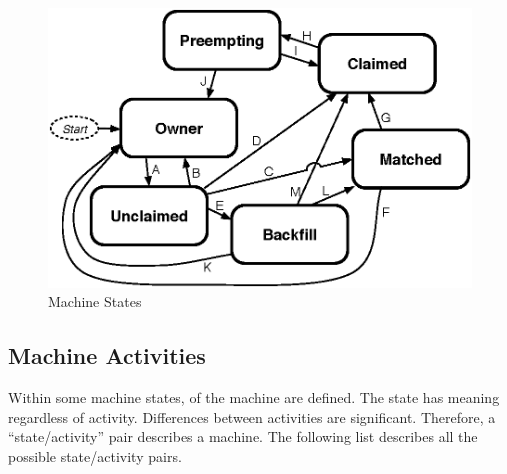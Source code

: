 \begin{figure}[hbt]
\centering
\includegraphics{admin-man/machine-states.eps}
\caption{\label{fig:machine-states}Machine States}
\end{figure}

\subsection{\label{sec:Activities}
Machine Activities}

Within some machine states,
 of the machine are defined.
The state has meaning regardless of activity.
Differences between activities are significant.
Therefore, a ``state/activity'' pair describes
a machine.
The following list describes all the possible state/activity pairs.

